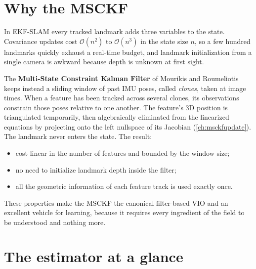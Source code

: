 \section{Why the MSCKF}

In EKF-SLAM every tracked landmark adds three variables to the state. Covariance updates cost
$\mathcal{O}(n^2)$ to $\mathcal{O}(n^3)$ in the state size $n$, so a few hundred landmarks quickly
exhaust a real-time budget, and landmark initialization from a single camera is awkward because
depth is unknown at first sight.

The \textbf{Multi-State Constraint Kalman Filter} of Mourikis and Roumeliotis~\cite{mourikis2007msckf}
keeps instead a sliding window of past IMU poses, called \emph{clones}, taken at image times. When a
feature has been tracked across several clones, its observations constrain those poses relative to
one another. The feature's 3D position is triangulated temporarily, then algebraically
eliminated from the linearized equations by projecting onto the left nullspace of its Jacobian
(\cref{ch:msckfupdate}). The landmark never enters the state. The result:
\begin{itemize}
  \item cost linear in the number of features and bounded by the window size;
  \item no need to initialize landmark depth inside the filter;
  \item all the geometric information of each feature track is used exactly once.
\end{itemize}
These properties make the MSCKF the canonical filter-based VIO and an excellent vehicle for
learning, because it requires every ingredient of the field to be understood and nothing more.

\section{The estimator at a glance}

